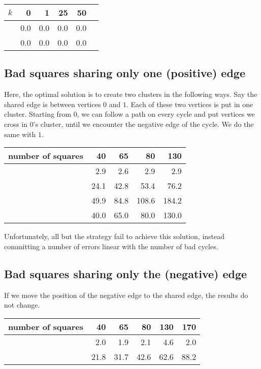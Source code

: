 \begin{center}
\begin{tabular}{lrrrrr}
\toprule
$k$ &   0  &   1  &   25 &   50  \\
\midrule
\pot{} & 0.0 & 0.0 & 0.0 & 0.0  \\
\pat{} &  0.0 &  0.0 & 0.0 & 0.0  \\
\bottomrule
\end{tabular}
\end{center}

\subsection{Bad squares sharing only one (positive) edge}
\label{sub:squares}
Here, the optimal solution is to create two clusters in the following ways.
Say the shared edge is between vertices $0$ and $1$. Each of these two
vertices is put in one cluster. Starting from $0$, we can follow a path on
every cycle and put vertices we cross in $0$'s cluster, until we encounter the
negative edge of the cycle. We do the same with $1$.

\begin{center}
\begin{tabular}{lrrrr}
\toprule
number of squares & 40   & 65   & 80    & 130 \\
\midrule
\pot{}            & 2.9  & 2.6  & 2.9   & 2.9 \\
\pat{}            & 24.1 & 42.8 & 53.4  & 76.2 \\
\nnot{}           & 49.9 & 84.8 & 108.6 & 184.2 \\
\nat{}            & 40.0 & 65.0 & 80.0  & 130.0\\
\bottomrule
\end{tabular}
\end{center}

Unfortunately, all but the \pot{} strategy fail to achieve this solution,
instead committing a number of errors linear with the number of bad cycles.


\subsection{Bad squares sharing only the (negative) edge}

If we move the position of the negative edge to the shared edge, the results
do not change.

\begin{center}
\begin{tabular}{lrrrrr}
\toprule
number of squares &  40  &  65  &  80  &  130 &  170 \\
\midrule
\pot{} &  2.0 &  1.9 &  2.1 &  4.6 &  2.0 \\
\pat{} & 21.8 & 31.7 & 42.6 & 62.6 & 88.2 \\
\bottomrule
\end{tabular}
\end{center}

